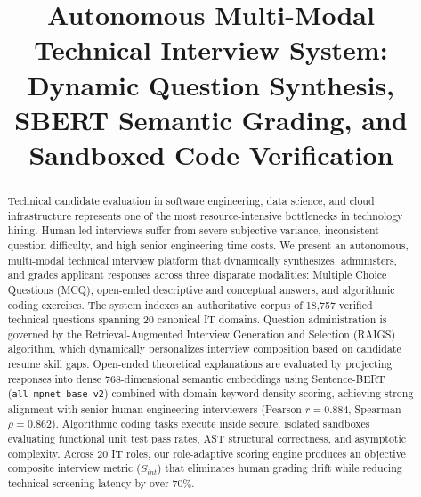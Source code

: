 \documentclass[conference]{IEEEtran}
\begin{document}
\title{Autonomous Multi-Modal Technical Interview System: Dynamic Question Synthesis, SBERT Semantic Grading, and Sandboxed Code Verification}

\author{
}

\maketitle

\begin{abstract}
Technical candidate evaluation in software engineering, data science, and cloud infrastructure represents one of the most resource-intensive bottlenecks in technology hiring. Human-led interviews suffer from severe subjective variance, inconsistent question difficulty, and high senior engineering time costs. We present an autonomous, multi-modal technical interview platform that dynamically synthesizes, administers, and grades applicant responses across three disparate modalities: Multiple Choice Questions (MCQ), open-ended descriptive and conceptual answers, and algorithmic coding exercises. The system indexes an authoritative corpus of 18,757 verified technical questions spanning 20 canonical IT domains. Question administration is governed by the Retrieval-Augmented Interview Generation and Selection (RAIGS) algorithm, which dynamically personalizes interview composition based on candidate resume skill gaps. Open-ended theoretical explanations are evaluated by projecting responses into dense 768-dimensional semantic embeddings using Sentence-BERT (\texttt{all-mpnet-base-v2}) combined with domain keyword density scoring, achieving strong alignment with senior human engineering interviewers (Pearson $r = 0.884$, Spearman $\rho = 0.862$). Algorithmic coding tasks execute inside secure, isolated sandboxes evaluating functional unit test pass rates, AST structural correctness, and asymptotic complexity. Across 20 IT roles, our role-adaptive scoring engine produces an objective composite interview metric ($S_{int}$) that eliminates human grading drift while reducing technical screening latency by over 70\%.
\end{abstract}
\end{document}
